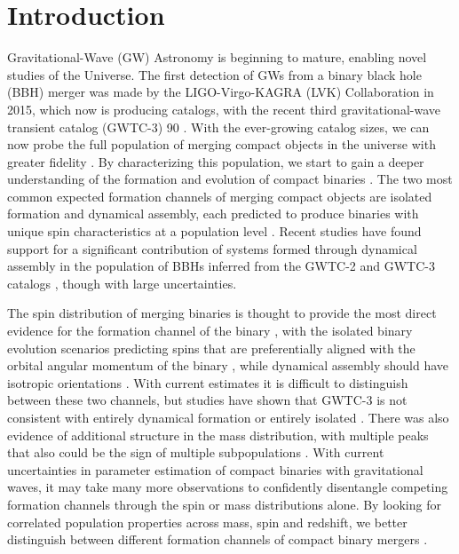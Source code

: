 \section{Introduction} \label{sec:intro}

Gravitational-Wave (GW) Astronomy is beginning to mature, enabling novel studies of the Universe. The first detection of GWs from a binary black hole (BBH) merger was made by the LIGO-Virgo-KAGRA (LVK) Collaboration in 2015, which now is producing catalogs, with the recent third gravitational-wave transient catalog (GWTC-3) 90 \citep{2015CQGra..32g4001L,2015CQGra..32b4001A,2021PTEP.2021eA102A,2016PhRvL.116f1102A,2019PhRvX...9c1040A,2021PhRvX..11b1053A,2021arXiv211103606T}. With the ever-growing catalog sizes, we can now probe the full population of merging compact objects in the universe with greater fidelity \citep{2019ApJ...882L..24A,2021ApJ...913L...7A,2021arXiv211103634T}. By characterizing this population, we start to gain a deeper understanding of the formation and evolution of compact binaries \citep{2017ApJ...846...82Z}. The two most common expected formation channels of merging compact objects are isolated formation and dynamical assembly, each predicted to produce binaries with unique spin characteristics at a population level \citep{2017Natur.548..426F,2018ApJ...854L...9F}. Recent studies have found support for a significant contribution of systems formed through dynamical assembly in the population of BBHs inferred from the GWTC-2 and GWTC-3 catalogs \citep{2021ApJ...913L...7A,2021PhRvD.104h3010R,2021arXiv211103634T,2022ApJ...937L..13C,2021ApJ...921L..15G,2022arXiv220902206T,2022arXiv220906978V,2022arXiv221012834E}, though with large uncertainties. 

The spin distribution of merging binaries is thought to provide the most direct evidence for the formation channel of the binary \citep{2017Natur.548..426F,2018ApJ...854L...9F}, with the isolated binary evolution scenarios predicting spins that are preferentially aligned with the orbital angular momentum of the binary \citep{10.1051/0004-6361/201936204,10.1051/0004-6361/202039804}, while dynamical assembly should have isotropic orientations \citep{10.3847/2041-8205/832/1/L2,10.1103/PhysRevD.100.043027}. With current estimates it is difficult to distinguish between these two channels, but studies have shown that GWTC-3 is not consistent with entirely dynamical formation or entirely isolated \citep{2021arXiv211103634T,2022ApJ...937L..13C,2022arXiv220902206T,2022arXiv221012834E,10.3847/2041-8213/ac86c4}. There was also evidence of additional structure in the mass distribution, with multiple peaks that also could be the sign of multiple subpopulations \citep{2021ApJ...913L..19T,2022ApJ...924..101E,2021arXiv211103634T,2022ApJ...928..155T,2022arXiv221012834E}. With current uncertainties in parameter estimation of compact binaries with gravitational waves, it may take many more observations to confidently disentangle competing formation channels through the spin or mass distributions alone. By looking for correlated population properties across mass, spin and redshift, we better distinguish between different formation channels of compact binary mergers \citep{2021ApJ...912...98F,2021ApJ...922L...5C,2022ApJ...931...17V,2022ApJ...932L..19B}. 

